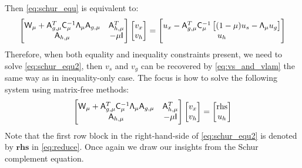 Then \eqref{eq:schur_equ} is equivalent to: 
\begin{equation}\label{eq:schur_equ2}
\begin{bmatrix}
\mathsf{W}_\mu +  \mathsf{A}_{g,\mu}^T  \mathsf{C}_\mu^{-1} \mathsf{\Lambda}_\mu    \mathsf{A}_{g,\mu}    & \mathsf{A}_{h,\mu}^T   \\
\mathsf{A}_{h,\mu}  & -\mu \mathsf{I}
\end{bmatrix}
\begin{bmatrix} v_x \\ v_h  \end{bmatrix} 
=
\begin{bmatrix} u_x - \mathsf{A}_{g,\mu}^T \mathsf{C}_\mu^{-1}  \left[(1-\mu) u_s  - \mathsf{\Lambda}_\mu u_g     \right]  \\ u_h  \end{bmatrix} 
\end{equation}
Therefore, when both equality and inequality constraints present, we need to solve \eqref{eq:schur_equ2}, then 
$v_s$ and $v_g$ can be recovered by \eqref{eq:vs_and_vlam} the same way as in inequality-only case.
The focus is how to solve the following system using matrix-free methods: 
\begin{equation}\label{eq:reduce}
\begin{bmatrix}
\mathsf{W}_\mu +  \mathsf{A}_{g,\mu}^T  \mathsf{C}_\mu^{-1} \mathsf{\Lambda}_\mu  \mathsf{A}_{g,\mu}    & \mathsf{A}_{h,\mu}^T   \\
\mathsf{A}_{h,\mu}  & -\mu \mathsf{I}
\end{bmatrix}
\begin{bmatrix} v_x \\ v_h  \end{bmatrix} 
=
\begin{bmatrix} \text{rhs}   \\ u_h  \end{bmatrix} 
\end{equation}
Note that the first row block in the right-hand-side of \eqref{eq:schur_equ2} is denoted by $\textbf{rhs}$ in \eqref{eq:reduce}.  
Once again we draw our insights from the Schur complement equation. 
